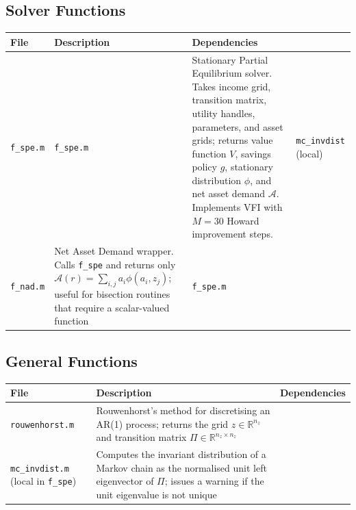 \documentclass{article}
\begin{document}
\subsection{Solver Functions}

\vspace{0.5cm}
\begin{tabularx}{\linewidth}{|X|X|X|}
    \hline
    \textbf{File} & \textbf{Description} & \textbf{Dependencies} \\
    \hline
    \texttt{f\_spe.m} &
        \texttt{f\_spe.m} &
        Stationary Partial Equilibrium solver. Takes income grid, transition
        matrix, utility handles, parameters, and asset grids; returns value
        function $V$, savings policy $g$, stationary distribution $\phi$,
        and net asset demand $\mathcal{A}$. Implements VFI with $M=30$
        Howard improvement steps. &
        \texttt{mc\_invdist} (local) \\
    \hline
    \texttt{f\_nad.m} &
        Net Asset Demand wrapper. Calls \texttt{f\_spe} and returns only
        $\mathcal{A}(r) = \sum_{i,j} a_i \phi(a_i, z_j)$; useful for bisection
        routines that require a scalar-valued function &
        \texttt{f\_spe.m} \\
    \hline
\end{tabularx}

\subsection{General Functions}

\vspace{0.5cm}
\begin{tabularx}{\linewidth}{|X|X|X|}
    \hline
    \textbf{File} & \textbf{Description} & \textbf{Dependencies} \\
    \hline
    \texttt{rouwenhorst.m} &
        Rouwenhorst's method for discretising an AR(1) process; returns the
        grid $z \in \mathbb{R}^{n_z}$ and transition matrix $\Pi \in \mathbb{R}^{n_z \times n_z}$ & \\
    \hline
    \texttt{mc\_invdist.m} (local in \texttt{f\_spe}) &
        Computes the invariant distribution of a Markov chain as the normalised
        unit left eigenvector of $\Pi$; issues a warning if the unit eigenvalue
        is not unique & \\
    \hline
\end{tabularx}
\end{document}
